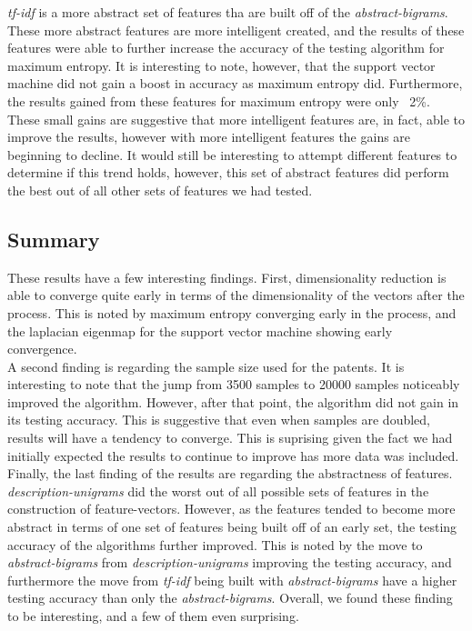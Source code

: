 \emph{tf-idf} is a more abstract set of features tha are built off of the \emph{abstract-bigrams}.  These more abstract features are more intelligent created, and the results of these features were able to further increase the accuracy of the testing algorithm for maximum entropy.  It is interesting to note, however, that the support vector machine did not gain a boost in accuracy as maximum entropy did.  Furthermore, the results gained from these features for maximum entropy were only ~2\%.  These small gains are suggestive that more intelligent features are, in fact, able to improve the results, however with more intelligent features the gains are beginning to decline.  It would still be interesting to attempt different features to determine if this trend holds, however, this set of abstract features did perform the best out of all other sets of features we had tested.

\subsection{Summary}

These results have a few interesting findings.  First, dimensionality reduction is able to converge quite early in terms of the dimensionality of the vectors after the process.  This is noted by maximum entropy converging early in the process, and the laplacian eigenmap for the support vector machine showing early convergence.  
\\A second finding is regarding the sample size used for the patents.  It is interesting to note that the jump from 3500 samples to 20000 samples noticeably improved the algorithm.  However, after that point, the algorithm did not gain in its testing accuracy.  This is suggestive that even when samples are doubled, results will have a tendency to converge.  This is suprising given the fact we had initially expected the results to continue to improve has more data was included.
\\Finally, the last finding of the results are regarding the abstractness of features.  \emph{description-unigrams} did the worst out of all possible sets of features in the construction of feature-vectors.  However, as the features tended to become more abstract in terms of one set of features being built off of an early set, the testing accuracy of the algorithms further improved.  This is noted by the move to \emph{abstract-bigrams} from \emph{description-unigrams} improving the testing accuracy, and furthermore the move from \emph{tf-idf} being built with \emph{abstract-bigrams} have a higher testing accuracy than only the \emph{abstract-bigrams}. Overall, we found these finding to be interesting, and a few of them even surprising.